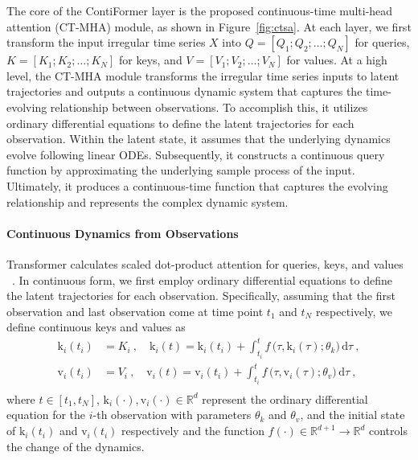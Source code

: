 \documentclass{article}
\begin{document}
The core of the ContiFormer layer is the proposed continuous-time multi-head attention (CT-MHA) module, as shown in Figure~\ref{fig:ctsa}.
At each layer, we first transform the input irregular time series $X$ into $Q=[Q_1; Q_2; \ldots; Q_N]$ for queries, $K=[K_1; K_2; \ldots; K_N]$ for keys, and $V=[V_1; V_2; \ldots; V_N]$ for values. 
At a high level, the CT-MHA module transforms the irregular time series inputs to latent trajectories and outputs a continuous dynamic system that captures the time-evolving relationship between observations. 
To accomplish this, it utilizes ordinary differential equations to define the latent trajectories for each observation.
Within the latent state, it assumes that the underlying dynamics evolve following linear ODEs.
Subsequently, it constructs a continuous query function by approximating the underlying sample process of the input.
Ultimately, it produces a continuous-time function that captures the evolving relationship and represents the complex dynamic system.

\paragraph{Continuous Dynamics from Observations} 

Transformer calculates scaled dot-product attention for queries, keys, and values ~\cite{vaswani2017attention}. In continuous form, we first employ ordinary differential equations to define the latent trajectories for each observation. Specifically, assuming that the first observation and last observation come at time point $t_1$ and $t_N$ respectively, we define continuous keys and values as
\begin{equation}
    \begin{aligned}
        \boldsymbol{\mathrm{k}}_i(t_i) & = K_i ~, \quad   \boldsymbol{\mathrm{k}}_i(t) = \boldsymbol{\mathrm{k}}_i(t_i) + \int_{t_i}^{t} f\,\Big( \tau, \boldsymbol{\mathrm{k}}_i(\tau); \theta_k \Big)\, \text{d} \tau ~,\\
        \boldsymbol{\mathrm{v}}_i(t_i) & = V_i ~, \quad   \boldsymbol{\mathrm{v}}_i(t) = \boldsymbol{\mathrm{v}}_i(t_i) + \int_{t_i}^{t} f\,\Big( \tau, \boldsymbol{\mathrm{v}}_i(\tau); \theta_v \Big)\, \text{d} \tau ~, \\
    \end{aligned}
\label{eq:kv}
\end{equation}
where $t\in [t_1, t_N]$, $\boldsymbol{\mathrm{k}}_i(\cdot), \boldsymbol{\mathrm{v}}_i(\cdot) \in \mathbb{R}^{d}$ represent the ordinary differential equation for the $i$-th observation with parameters $\theta_k$ and $\theta_v$, and the initial state of $\boldsymbol{\mathrm{k}}_i(t_i)$ and $\boldsymbol{\mathrm{v}}_i(t_i)$ respectively and the function $f\left( \cdot \right) \in \mathbb{R}^{d+1} \rightarrow \mathbb{R}^{d}$ controls the change of the dynamics.
\end{document}
